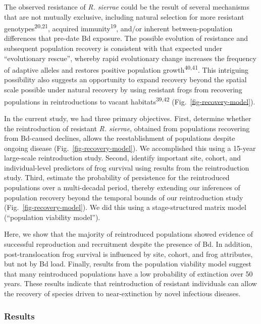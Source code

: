 \documentclass[
  letterpaper,
  DIV=11,
  numbers=noendperiod]{scrartcl}
\begin{document}
The observed resistance of \emph{R. sierrae} could be the result of
several mechanisms that are not mutually exclusive, including natural
selection for more resistant genotypes\textsuperscript{20,21}, acquired
immunity\textsuperscript{19}, and/or inherent between-population
differences that pre-date Bd exposure. The possible evolution of
resistance and subsequent population recovery is consistent with that
expected under ``evolutionary rescue'', whereby rapid evolutionary
change increases the frequency of adaptive alleles and restores positive
population growth\textsuperscript{40,41}. This intriguing possibility
also suggests an opportunity to expand recovery beyond the spatial scale
possible under natural recovery by using resistant frogs from recovering
populations in reintroductions to vacant habitats\textsuperscript{39,42}
(Fig.~\ref{fig-recovery-model}).

In the current study, we had three primary objectives. First, determine
whether the reintroduction of resistant \emph{R. sierrae}, obtained from
populations recovering from Bd-caused declines, allows the
reestablishment of populations despite ongoing disease
(Fig.~\ref{fig-recovery-model}). We accomplished this using a 15-year
large-scale reintroduction study. Second, identify important site,
cohort, and individual-level predictors of frog survival using results
from the reintroduction study. Third, estimate the probability of
persistence for the reintroduced populations over a multi-decadal
period, thereby extending our inferences of population recovery beyond
the temporal bounds of our reintroduction study
(Fig.~\ref{fig-recovery-model}). We did this using a stage-structured
matrix model (``population viability model'').

Here, we show that the majority of reintroduced populations showed
evidence of successful reproduction and recruitment despite the presence
of Bd. In addition, post-translocation frog survival is influenced by
site, cohort, and frog attributes, but not by Bd load. Finally, results
from the population viability model suggest that many reintroduced
populations have a low probability of extinction over 50 years. These
results indicate that reintroduction of resistant individuals can allow
the recovery of species driven to near-extinction by novel infectious
diseases.

\subsubsection{Results}\label{results}
\end{document}
